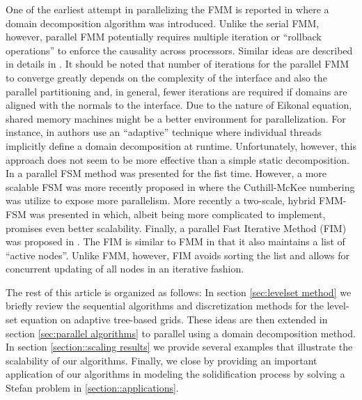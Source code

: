 One of the earliest attempt in parallelizing the FMM is reported in \cite{Herrmann:03:A-domain-decompositi} where a domain decomposition algorithm was introduced. Unlike the serial FMM, however, parallel FMM potentially requires multiple iteration or ``rollback operations'' to enforce the causality across processors. Similar ideas are described in details in \cite{Tugurlan:08:Fast-marching-method}. It should be noted that number of iterations for the parallel FMM to converge greatly depends on the complexity of the interface and also the parallel partitioning and, in general, fewer iterations are required if domains are aligned with the normals to the interface. Due to the nature of Eikonal equation, shared memory machines might be a better environment for parallelization. For instance, in \cite{Breus;Cristiani;Gwosdek;etal:11:An-adaptive-domain-d} authors use an ``adaptive'' technique where individual threads implicitly define a domain decomposition at runtime. Unfortunately, however, this approach does not seem to be more effective than a simple static decomposition. In \cite{Zhao:07:Parallel-implementat} a parallel FSM method was presented for the fist time. However, a more scalable FSM was more recently proposed in \cite{Detrixhe;Gibou;Min:13:A-parallel-fast-swee} where the Cuthill-McKee numbering was utilize to expose more parallelism. More recently a two-scale, hybrid FMM-FSM was presented in \cite{Chacon;Vladimirsky:13:A-parallel-Heap-Cell} which, albeit being more complicated to implement, promises even better scalability. Finally, a parallel Fast Iterative Method (FIM) was proposed in \cite{Jeong;Whitaker:08:A-fast-iterative-met}. The FIM is similar to FMM in that it also maintains a list of ``active nodes''. Unlike FMM, however, FIM avoids sorting the list and allows for concurrent updating of all nodes in an iterative fashion.

The rest of this article is organized as follows: In section \ref{sec:levelset method} we briefly review the sequential algorithms and discretization methods for the level-set equation on adaptive tree-based grids. These ideas are then extended in section \ref{sec:parallel algorithms} to parallel using a domain decomposition method. In section \ref{section::scaling results} we provide several examples that illustrate the scalability of our algorithms. Finally, we close by providing an important application of our algorithms in modeling the solidification process by solving a Stefan problem in \ref{section::applications}.
